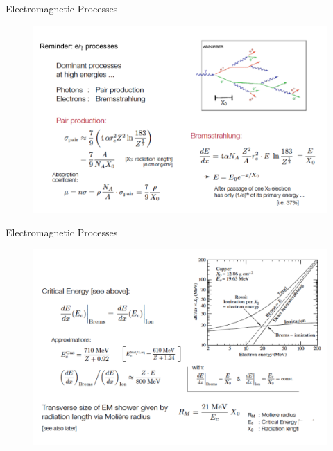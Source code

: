 \documentclass[style=husky,clock,size=9pt,dvipsnames]{powerdot}
\begin{document}
\begin{slide}[trans=Fly,toc=]{Electromagnetic Processes}
	\begin{figure}
		\includegraphics[width=\linewidth]{Figures/reminder_1}
	\end{figure}
\end{slide}

\begin{slide}[trans=Fly,toc=]{Electromagnetic Processes}
	\begin{figure}
	\includegraphics[width=\linewidth]{Figures/reminder_2}
\end{figure}	
\end{slide}
\end{document}
